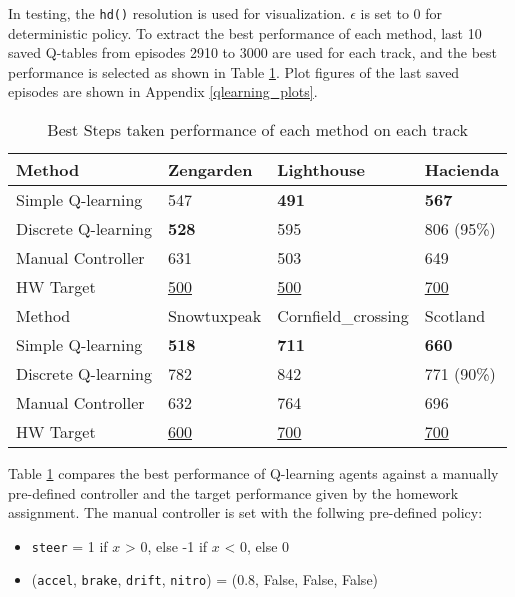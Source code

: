 \documentclass{article}
\begin{document}
In testing, the \texttt{hd()} resolution is used for visualization. $\epsilon$ is set to 0 for deterministic policy. To extract the best performance of each method, last 10 saved Q-tables from episodes 2910 to 3000 are used for each track, and the best performance is selected as shown in Table \ref{best_performance}. Plot figures of the last saved episodes are shown in Appendix \ref{qlearning_plots}.


\begin{table}[h]
    \caption{Best Steps taken performance of each method on each track}
    \label{best_performance}
    \centering
    \begin{tabular}{llll}
        \toprule
        Method              & Zengarden    & Lighthouse      & Hacienda  \\
        \midrule
        Simple Q-learning   & 547          & \textbf{491}    & \textbf{567}  \\
        Discrete Q-learning & \textbf{528} & 595             & 806 (95\%)  \\
        Manual Controller   & 631          & 503             & 649  \\
        HW Target & \underline{500}        & \underline{500} & \underline{700}  \\
        \bottomrule
        \toprule
        Method              & Snowtuxpeak  & Cornfield\_crossing & Scotland  \\
        \midrule
        Simple Q-learning   & \textbf{518} & \textbf{711}    & \textbf{660}  \\
        Discrete Q-learning & 782          & 842             & 771 (90\%)  \\
        Manual Controller   & 632          & 764             & 696  \\
        HW Target & \underline{600}        & \underline{700} & \underline{700}  \\
        \bottomrule
    \end{tabular}
\end{table}


Table \ref{best_performance} compares the best performance of Q-learning agents against a manually pre-defined controller and the target performance given by the homework assignment. The manual controller is set with the follwing pre-defined policy:

\begin{itemize}
    \item \texttt{steer} = 1 if $x$ > 0, else -1 if $x$ < 0, else 0
    \item (\texttt{accel}, \texttt{brake}, \texttt{drift}, \texttt{nitro}) = (0.8, False, False, False)
\end{itemize}
\end{document}
